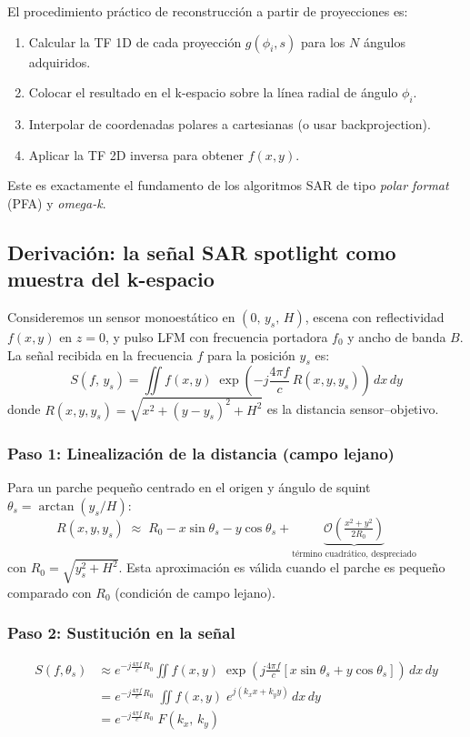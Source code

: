 \documentclass[12pt,a4paper,oneside]{book}
\begin{document}
El procedimiento práctico de reconstrucción a partir de proyecciones es:
\begin{enumerate}
  \item Calcular la TF 1D de cada proyección $g(\phi_i,s)$ para los $N$ ángulos adquiridos.
  \item Colocar el resultado en el k-espacio sobre la línea radial de ángulo $\phi_i$.
  \item Interpolar de coordenadas polares a cartesianas (o usar backprojection).
  \item Aplicar la TF 2D inversa para obtener $f(x,y)$.
\end{enumerate}
Este es exactamente el fundamento de los algoritmos SAR de tipo \emph{polar format} (PFA) y \emph{omega-k}.

\subsection{Derivación: la señal SAR spotlight como muestra del k-espacio}

Consideremos un sensor monoestático en $(0,\,y_s,\,H)$, escena con reflectividad $f(x,y)$ en $z=0$, y pulso LFM con frecuencia portadora $f_0$ y ancho de banda $B$. La señal recibida en la frecuencia $f$ para la posición $y_s$ es:
\[
S(f,\,y_s) = \iint f(x,y)\;\exp\!\left(-j\frac{4\pi f}{c}\,R(x,y,y_s)\right)\,dx\,dy
\]
donde $R(x,y,y_s)=\sqrt{x^2+(y-y_s)^2+H^2}$ es la distancia sensor--objetivo.

\subsubsection{Paso 1: Linealización de la distancia (campo lejano)}

Para un parche pequeño centrado en el origen y ángulo de squint $\theta_s=\arctan(y_s/H)$:
\[
R(x,y,y_s)\;\approx\; R_0 - x\sin\theta_s - y\cos\theta_s
    + \underbrace{\mathcal{O}\!\left(\tfrac{x^2+y^2}{2R_0}\right)}_{\text{término cuadrático, despreciado}}
\]
con $R_0=\sqrt{y_s^2+H^2}$. Esta aproximación es válida cuando el parche es pequeño comparado con $R_0$ (condición de campo lejano).

\subsubsection{Paso 2: Sustitución en la señal}

\begin{align}
S(f,\theta_s) &\approx e^{-j\frac{4\pi f}{c}R_0}
  \iint f(x,y)\;\exp\!\left(j\frac{4\pi f}{c}\left[x\sin\theta_s + y\cos\theta_s\right]\right)\,dx\,dy \nonumber\\
&= e^{-j\frac{4\pi f}{c}R_0}\;\iint f(x,y)\;e^{j(k_x x + k_y y)}\,dx\,dy \nonumber\\
&= e^{-j\frac{4\pi f}{c}R_0}\; F(k_x,\,k_y) \label{eq:sar_kspace}
\end{align}
\end{document}
